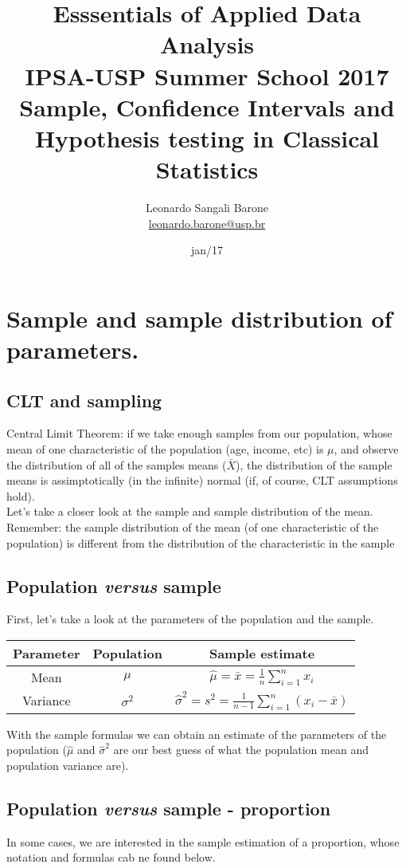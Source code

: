 \documentclass[11pt]{article}
\title{\textbf{Esssentials of Applied Data Analysis\\
				IPSA-USP Summer School 2017}\newline\\
				Sample, Confidence Intervals and Hypothesis testing in Classical Statistics}
\author{Leonardo Sangali Barone\\ \href{leonardo.barone@usp.br}{leonardo.barone@usp.br}}
\date{jan/17}
\begin{document}
\maketitle
\section{Sample and sample distribution of parameters.}

	\subsection*{CLT and sampling}
	
	Central Limit Theorem: if we take enough samples from our population, whose mean of one characteristic of the population (age, income, etc) is $\mu$, and observe the distribution of all of the samples means ($\bar{X}$), the distribution of the sample means is assimptotically (in the infinite) normal (if, of course, CLT assumptions hold).\\

	Let's take a closer look at the sample and sample distribution of the mean.\\
	
	Remember: the sample distribution of the mean (of one characteristic of the population) is different from the distribution of the characteristic in the sample

	\subsection*{Population \emph{versus} sample}
	First, let's take a look at the parameters of the population and the sample.\\

\begin{tabular}{|c|c|c|}
\hline
	Parameter & Population & Sample estimate\\ 
\hline
	Mean & $\mu$ & $\hat{\mu} = \bar{x} = \frac{1}{n}\sum\limits_{i=1}^n x_i $\\
	Variance & $\sigma^2$ & $\hat{\sigma}^2 = s^2 = \frac{1}{n-1}\sum\limits_{i=1}^n (x_i - \bar{x}) $\\
\hline
\end{tabular}

With the sample formulas we can obtain an estimate of the parameters of the population ($\hat{\mu}$ and $\hat{\sigma}^2$ are our best guess of what the population mean and population variance are).

	\subsection*{Population \emph{versus} sample - proportion}
	In some cases, we are interested in the sample estimation of a proportion, whose notation and formulas cab ne found below.\\
\end{document}
